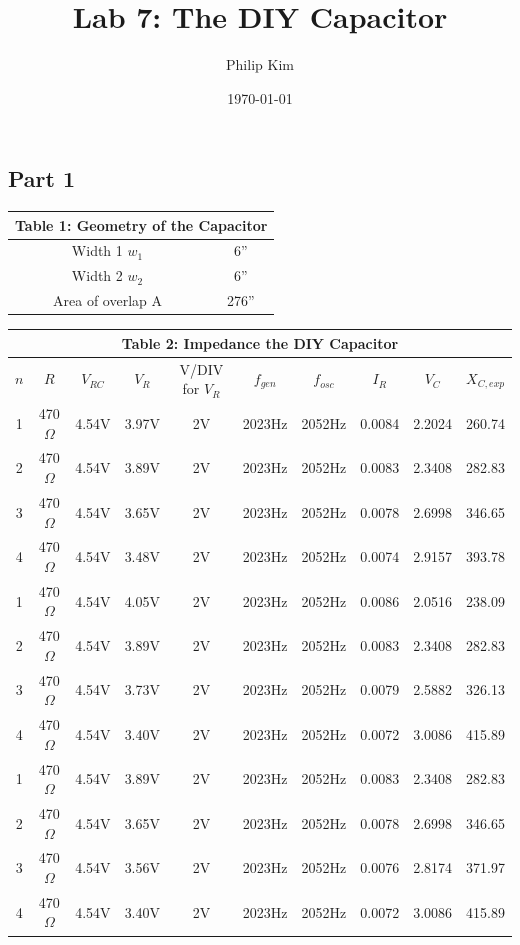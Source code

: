 \documentclass{article}
\title{Lab 7: The DIY Capacitor}
\author{Philip Kim}
\date{\today}
\begin{document}
\maketitle
\vspace*{-1cm}
\begin{table}[!htp]\centering
\subsection*{Part 1}
\begin{tabular}{|c|c|}\hline
  \multicolumn{2}{|c|}{\textbf{Table 1: Geometry of the Capacitor}} \\\hline
  Width 1 \(w_1\) & 6'' \\\hline
  Width 2 \(w_2\) & 6'' \\\hline
  Area of overlap A & 276'' \\\hline
  \end{tabular}
\end{table}

\begin{table}[!htp]\centering
  \begin{tabular}{|c|c|c|c|c|c|c|c|c|c|}\hline
    \multicolumn{10}{|c|}{\textbf{Table 2: Impedance the DIY Capacitor}} \\\hline
    \(n\) & \(R\) & \(V_{RC}\) & \(V_R\) & V/DIV for \(V_R\) & \(f_{gen}\) & \(f_{osc}\) & \(I_R\) & \(V_C\) & \(X_{C,exp}\) \\\hline
    1 & 470\(\Omega \) & 4.54V & 3.97V & 2V & 2023Hz & 2052Hz & 0.0084 & 2.2024 & 260.74 \\\hline
    2 & 470\(\Omega \) & 4.54V & 3.89V & 2V & 2023Hz & 2052Hz & 0.0083 & 2.3408 & 282.83 \\\hline
    3 & 470\(\Omega \) & 4.54V & 3.65V & 2V & 2023Hz & 2052Hz & 0.0078 & 2.6998 & 346.65 \\\hline
    4 & 470\(\Omega \) & 4.54V & 3.48V & 2V & 2023Hz & 2052Hz & 0.0074 & 2.9157 & 393.78 \\\hline
    1 & 470\(\Omega \) & 4.54V & 4.05V & 2V & 2023Hz & 2052Hz & 0.0086 & 2.0516 & 238.09 \\\hline
    2 & 470\(\Omega \) & 4.54V & 3.89V & 2V & 2023Hz & 2052Hz & 0.0083 & 2.3408 & 282.83 \\\hline
    3 & 470\(\Omega \) & 4.54V & 3.73V & 2V & 2023Hz & 2052Hz & 0.0079 & 2.5882 & 326.13 \\\hline
    4 & 470\(\Omega \) & 4.54V & 3.40V & 2V & 2023Hz & 2052Hz & 0.0072 & 3.0086 & 415.89 \\\hline
    1 & 470\(\Omega \) & 4.54V & 3.89V & 2V & 2023Hz & 2052Hz & 0.0083 & 2.3408 & 282.83 \\\hline
    2 & 470\(\Omega \) & 4.54V & 3.65V & 2V & 2023Hz & 2052Hz & 0.0078 & 2.6998 & 346.65 \\\hline
    3 & 470\(\Omega \) & 4.54V & 3.56V & 2V & 2023Hz & 2052Hz & 0.0076 & 2.8174 & 371.97 \\\hline
    4 & 470\(\Omega \) & 4.54V & 3.40V & 2V & 2023Hz & 2052Hz & 0.0072 & 3.0086 & 415.89 \\\hline
  \end{tabular}
\end{table}
\end{document}
